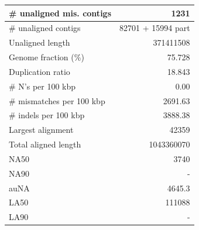 \documentclass[12pt,a4paper]{article}
\begin{document}
\begin{table}[ht]
\begin{center}
\begin{tabular}{|l*{1}{|r}|}
\# unaligned mis. contigs & 1231 \\ \hline
\# unaligned contigs & 82701 + 15994 part \\ \hline
Unaligned length & 371411508 \\ \hline
Genome fraction (\%) & 75.728 \\ \hline
Duplication ratio & 18.843 \\ \hline
\# N's per 100 kbp & 0.00 \\ \hline
\# mismatches per 100 kbp & 2691.63 \\ \hline
\# indels per 100 kbp & 3888.38 \\ \hline
Largest alignment & 42359 \\ \hline
Total aligned length & 1043360070 \\ \hline
NA50 & 3740 \\ \hline
NA90 & - \\ \hline
auNA & 4645.3 \\ \hline
LA50 & 111088 \\ \hline
LA90 & - \\ \hline
\end{tabular}
\end{center}
\end{table}
\end{document}
